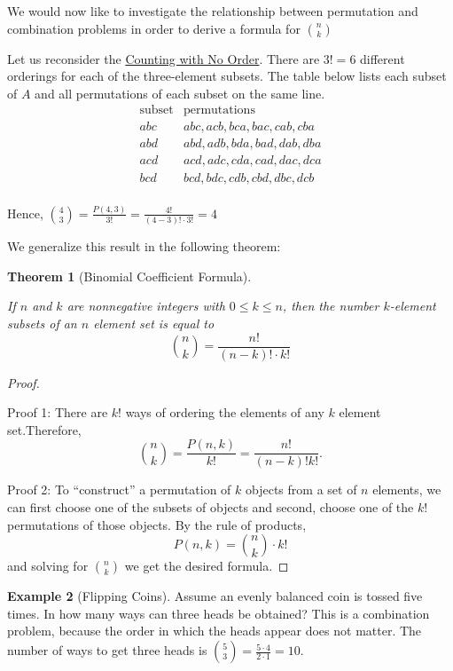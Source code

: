 \documentclass[10pt,]{book}
\theoremstyle{plain}
\newtheorem{theorem}{Theorem}[section]
\theoremstyle{definition}
\newtheorem{example}[theorem]{Example}
\begin{document}
\label{notation-9}
\par
We would now like to investigate the relationship between permutation and combination problems in order to derive a formula for \(\binom{n}{k}\)%
\par
Let us reconsider the \hyperref[four-choose-three]{Counting with No Order}. There are \(3 ! = 6\) different orderings for each of the three-element subsets. The table below lists each subset of \(A\)  and all permutations of each subset on the same line.
\[
 \begin{array}{cc}
 \textrm{subset} & \textrm{permutations} \\
 abc & abc,acb,bca,bac,cab,cba \\
 abd & abd,adb,bda,bad,dab,dba \\
 acd & acd,adc,cda,cad,dac,dca \\
 bcd & bcd,bdc,cdb,cbd,dbc,dcb \\
\end{array}
 \]%
\par
 Hence, \(\binom{4}{3} = \frac{P(4,3)}{3!} = \frac{4!}{(4-3)! \cdot 3!} = 4\)%
\par
 We generalize this result in the following theorem:%
\begin{theorem}[Binomial Coefficient Formula]\label{binomial-coefficient-formula}

If \(n\) and \(k\) are nonnegative integers with \(0 \leq k \leq n\), then the number \(k\)-element subsets of an \(n\) element set is equal to \[\binom{n}{k} = \frac{n!}{(n-k)! \cdot k!} \]\end{theorem}
\begin{proof}\hypertarget{proof-3}{}
Proof 1: There are \(k!\) ways of ordering the elements of any \(k\) element set.Therefore,
\[\binom{n}{k} = \frac{P(n,k)}{k!} = \frac{n!}{(n-k)! k!}.\]%
\par
Proof 2: To ``construct'' a permutation of \(k\)  objects from a set of \(n\) elements, we can first choose one of the subsets of objects and second, choose one of the \(k!\)  permutations of those objects. By the rule of products,\[P(n,k) = \binom{n}{k} \cdot k!\] and solving for \(\binom{n}{k}\) we get the desired formula.%
\end{proof}
\begin{example}[Flipping Coins]\label{flipping-coins}
  Assume an evenly balanced coin is tossed five times. In how many ways can three heads be obtained? This is a combination problem, because the order in which the heads appear does not matter. The number of ways to get three heads is \(\binom{5}{3}= \frac{5 \cdot 4}{2 \cdot 1} = 10\).
%
\end{example}
\end{document}
